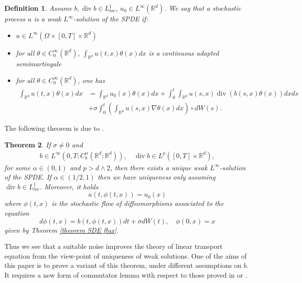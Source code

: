 \documentclass{article}
\newtheorem{theorem}{Theorem}
\newtheorem{definition}[theorem]{Definition}
\begin{document}
\begin{definition}
Assume $b,\operatorname{div}b\in L_{loc}^{1}$, $u_{0}\in
L^{\infty}\left( \mathbb{R}^{d}\right)  $. We say that a stochastic
process $u$ is a weak $L^{\infty}$-solution of the SPDE if:
\begin{itemize}
\item[i)] $u\in L^{\infty}\left(  \Omega\times\left[  0,T\right]  \times
\mathbb{R}^{d}\right)  $
\item[ii)] for all $\theta\in C_{0}^{\infty}\left(  \mathbb{R}^{d}\right)  $, $\int_{{\mathbb R}^d}u\left(  t,x\right)  \theta\left(  x\right)  dx$ is a continuous adapted semimartingale
\item[iii)] for all $\theta\in C_{0}^{\infty}\left(  \mathbb{R}^{d}\right)  $, one
has%
\begin{align*}
\int_{{\mathbb R}^d}u\left(  t,x\right)  \theta\left(  x\right)  dx
&  =\int_{{\mathbb R}^d}u_{0}\left( x\right)  \theta\left(  x\right)
dx+\int_{0}^{t}\int_{{\mathbb R}^d}u\left(  s,x\right)
\operatorname{div}\left( b\left(s,  x\right)  \theta\left(  x\right)
\right)
dxds\\
&  +\sigma\int_{0}^{t}\left(  \int_{{\mathbb R}^d}u\left(
s,x\right)  \nabla\theta\left( x\right)  dx\right)  \circ dW\left(
s\right)  .
\end{align*}
\end{itemize}
\end{definition}
The following theorem is due to \cite{FGP}.
\begin{theorem} \label{fgpp}
If $\sigma\neq0$ and%
 \begin{align} \label{c34}
b\in L^{\infty}\left(  0,T ;C_{b}^{\alpha}\left(  \mathbb{R}^{d}%
;\mathbb{R}^{d}\right)   \right)  ,\quad\operatorname{div}b\in L^{p}
([0,T] \times \mathbb{R}^d),
\end{align}
for some $\alpha\in\left(  0,1\right)  $ and $p>d\wedge2$, then
there exists a unique weak $L^{\infty}$-solution of the SPDE. If
$\alpha\in(1/2,1)$ then we have uniqueness only assuming
$\operatorname{div} b \in L^{1}_{loc}$.
%
Moreover, it holds%
\[
u\left(  t,\phi\left(  t,x\right)  \right)  =u_{0}\left(  x\right)
\]
where $\phi\left(  t,x\right)  $ is the stochastic flow of diffeomorphisms
associated to the equation%
\[
d\phi\left(  t,x\right)  =b\left( t, \phi\left(  t,x\right)  \right)
dt+\sigma dW\left(  t\right)  ,\quad\phi\left(  0,x\right)  =x
\]
given by Theorem \ref{theorem SDE flux}.
\end{theorem}

Thus we see that a suitable noise improves the theory of linear transport
equation from the view-point of uniqueness of weak solutions. One of the aims
of this paper is to prove a variant of this theorem, under different
assumptions on $b$. It requires a new form of commutator lemma with respect to
those proved in \cite{DiPernaLions} or \cite{FGP}.
\end{document}
